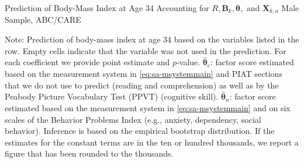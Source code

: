 \begin{table}
\begin{threeparttable}
\caption{Prediction of Body-Mass Index at Age 34 Accounting for $R, \bm{B}_k, \bm{\theta},$ and $\bm{X}_{k,a}$ Male Sample, ABC/CARE}
\label{table:end3}
\centering
\scriptsize

\begin{tablenotes}
\footnotesize
\item Note: Prediction of body-mass index at age 34 based on the variables listed in the row. Empty cells indicate that the variable was not used in the prediction. For each coefficient we provide point estimate and $p$-value. $\hat{\bm{\theta}}_{c}$: factor score estimated based on the measurement system in \eqref{eq:sa-msystemmain} and PIAT sections that we do not use to predict (reading and comprehension) as well as by the Peabody Picture Vocabulary Test (PPVT) (cognitive skill). $\hat{\bm{\theta}}_{n}$: factor score estimated based on the measurement system in \eqref{eq:sa-msystemmain} and on six scales of the Behavior Problems Index (e.g., anxiety, dependency, social behavior). Inference is based on the empirical bootstrap distribution. If the estimates for the constant terms are in the ten or hundred thousands, we report a figure that has been rounded to the thousands.
\end{tablenotes}
\end{threeparttable}
\end{table}

